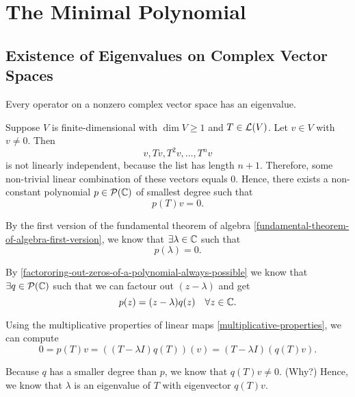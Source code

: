 \section{The Minimal Polynomial}
\subsection{Existence of Eigenvalues on Complex Vector Spaces}

\begin{thm} 
  \label{thm: existence of eigenvalues}
  Every operator on a \fd non\-zero complex vector space has an eigenvalue.
\end{thm}
\begin{prf}
  Suppose $V$ is finite-dimensional with $\dim V \geq 1$ and $T\in \mathcal{L}(V)$. Let $v\in V$ with  $v\neq0$. Then
  \begin{equation}
    v, Tv, T^2v, \dots, T^nv
  \end{equation}
  is not linearly independent,
  because the list has length $n+1$. Therefore, some non-trivial linear combination of these vectors equals $0$.
  Hence, there exists a non-constant polynomial $p \in \mathcal{P}(\mathbb{C})$ of smallest degree such that
  \begin{equation}
    p(T)v = 0.
  \end{equation}

  By the first version of the fundamental theorem of algebra \ref{fundamental-theorem-of-algebra-first-version}, we know that $\exists \lambda \in \mathbb{C}$ such that
  \begin{equation}
    p(\lambda) = 0.
  \end{equation}

  By \ref{factororing-out-zeros-of-a-polynomial-always-possible} we know that $\exists q \in \mathcal {P} (\mathbb{C})$ such that we can factour out $(z-\lambda)$ and get
  \begin{equation}
    p(z) = (z-\lambda)  q(z) \quad \forall z \in \mathbb{C}.
  \end{equation}

  Using the multiplicative properties of linear maps \ref{multiplicative-properties}, we can compute \begin{equation}
    0=p(T)v=((T-\lambda I)q(T))(v)=(T-\lambda I) (q(T)v).
  \end{equation}

  Because $q$ has a smaller degree than $p$, we know that $ q(T)v \neq 0$. (Why?)
  Hence, we know that $\lambda$ is an eigenvalue of $T$ with eigenvector $q(T)v$.
\end{prf}

